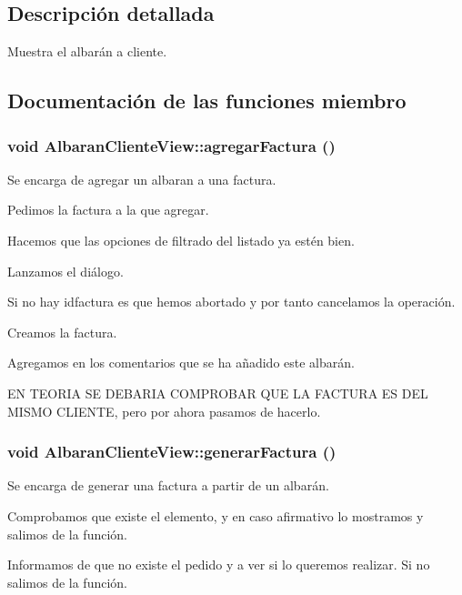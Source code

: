 \subsection{Descripci\'{o}n detallada}
Muestra el albar\'{a}n a cliente. 



\subsection{Documentaci\'{o}n de las funciones miembro}
\subsubsection{\setlength{\rightskip}{0pt plus 5cm}void Albaran\-Cliente\-View::agregar\-Factura ()}\label{classAlbaranClienteView_a0}


Se encarga de agregar un albaran a una factura. 

Pedimos la factura a la que agregar.

Hacemos que las opciones de filtrado del listado ya est\'{e}n bien.

Lanzamos el di\'{a}logo.

Si no hay idfactura es que hemos abortado y por tanto cancelamos la operaci\'{o}n.

Creamos la factura.

Agregamos en los comentarios que se ha a\~{n}adido este albar\'{a}n.

EN TEORIA SE DEBARIA COMPROBAR QUE LA FACTURA ES DEL MISMO CLIENTE, pero por ahora pasamos de hacerlo. 
\subsubsection{\setlength{\rightskip}{0pt plus 5cm}void Albaran\-Cliente\-View::generar\-Factura ()}\label{classAlbaranClienteView_a4}


Se encarga de generar una factura a partir de un albar\'{a}n. 

Comprobamos que existe el elemento, y en caso afirmativo lo mostramos y salimos de la funci\'{o}n.

Informamos de que no existe el pedido y a ver si lo queremos realizar. Si no salimos de la funci\'{o}n.

